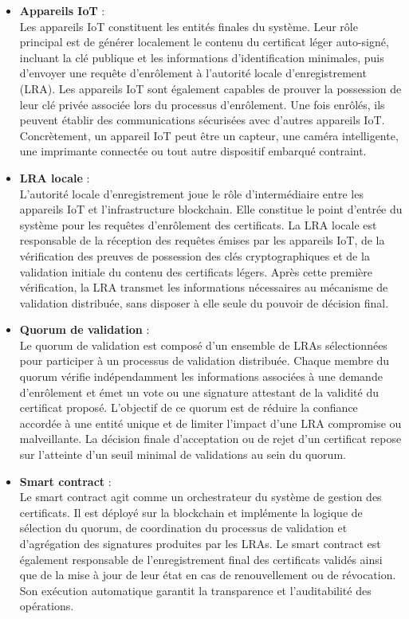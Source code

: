 \documentclass[12pt]{report}
\begin{document}
\begin{itemize}
\begin{itemize}
\begin{itemize}
    \item \textbf{Appareils IoT} : \\
    Les appareils IoT constituent les entités finales du système. Leur rôle principal est de générer localement le contenu du certificat léger auto-signé, incluant la clé publique et les informations d’identification minimales, puis d’envoyer une requête d’enrôlement à l’autorité locale d’enregistrement (LRA). Les appareils IoT sont également capables de prouver la possession de leur clé privée associée lors du processus d’enrôlement. Une fois enrôlés, ils peuvent établir des communications sécurisées avec d’autres appareils IoT. Concrètement, un appareil IoT peut être un capteur, une caméra intelligente, une imprimante connectée ou tout autre dispositif embarqué contraint.

    \item \textbf{LRA locale} : \\
    L’autorité locale d’enregistrement joue le rôle d’intermédiaire entre les appareils IoT et l’infrastructure blockchain. Elle constitue le point d’entrée du système pour les requêtes d’enrôlement des certificats. La LRA locale est responsable de la réception des requêtes émises par les appareils IoT, de la vérification des preuves de possession des clés cryptographiques et de la validation initiale du contenu des certificats légers. Après cette première vérification, la LRA transmet les informations nécessaires au mécanisme de validation distribuée, sans disposer à elle seule du pouvoir de décision final.

    \item \textbf{Quorum de validation} : \\
    Le quorum de validation est composé d’un ensemble de LRAs sélectionnées pour participer à un processus de validation distribuée. Chaque membre du quorum vérifie indépendamment les informations associées à une demande d’enrôlement et émet un vote ou une signature attestant de la validité du certificat proposé. L’objectif de ce quorum est de réduire la confiance accordée à une entité unique et de limiter l’impact d’une LRA compromise ou malveillante. La décision finale d’acceptation ou de rejet d’un certificat repose sur l’atteinte d’un seuil minimal de validations au sein du quorum.

    \item \textbf{Smart contract} : \\
    Le smart contract agit comme un orchestrateur du système de gestion des certificats. Il est déployé sur la blockchain et implémente la logique de sélection du quorum, de coordination du processus de validation et d’agrégation des signatures produites par les LRAs. Le smart contract est également responsable de l’enregistrement final des certificats validés ainsi que de la mise à jour de leur état en cas de renouvellement ou de révocation. Son exécution automatique garantit la transparence et l’auditabilité des opérations.


\end{itemize}
\end{itemize}
\end{itemize}
\end{document}
